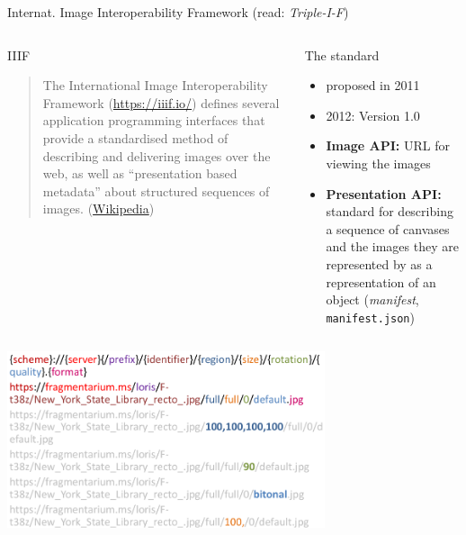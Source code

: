 \begin{frame}{Internat. Image Interoperability Framework (read: \emph{Triple-I-F})}

\begin{columns}
\begin{block}{IIIF}
\begin{quote}
    The International Image Interoperability Framework (\protect\url{https://iiif.io/}) defines several application programming interfaces that provide a standardised method of describing and delivering images over the web, as well as ``presentation based metadata'' about structured sequences of images. (\href{https://en.wikipedia.org/wiki/International_Image_Interoperability_Framework}{Wikipedia})
\end{quote}
\end{block}

\begin{block}{The standard}
\begin{itemize}\footnotesize
    \item proposed in 2011 
    \item 2012: Version 1.0
    \item \textbf{Image API:} URL for viewing the images
    \item \textbf{Presentation API:} standard for describing a sequence of canvases and the images they are represented by as a representation of an object (\emph{manifest}, \texttt{manifest.json})
\end{itemize}
\end{block}
\end{columns}

 \includegraphics[width=0.7\textwidth]{img/iiif.png}

\end{frame}
